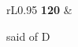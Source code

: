 {\begin{tabular}{rL{0.95\linewidth}}
\textbf{120} &\strut{}\smallmasktok{}\smallmasktok{}\smallmasktok{}\smallmasktok{}\smallmasktok{}\smallmasktok{}\smallmasktok{}\smallmasktok{}\smallmasktok{}\smallmasktok{}\smallmasktok{}\smallmasktok{}\smallmasktok{}\smallmasktok{}\smallmasktok{}\smallmasktok{}\smallmasktok{}\smallmasktok{}\smallmasktok{}\smallmasktok{}\smallmasktok{}\smallmasktok{}\smallmasktok{}\smallmasktok{}\smallmasktok{}\smallmasktok{}\smallmasktok{}\smallmasktok{}\smallmasktok{}\smallmasktok{}\smallmasktok{}\smallmasktok{}\smallmasktok{}\smallmasktok{}\smallmasktok{}\smallmasktok{}\smallmasktok{}\smallmasktok{}\smallmasktok{}\smallmasktok{}\smallmasktok{}\smallmasktok{}\smallmasktok{}\smallmasktok{}\smallmasktok{}\smallmasktok{}\smallmasktok{}\smallmasktok{}\smallmasktok{}\smallmasktok{}\smallmasktok{}\smallmasktok{}\smallmasktok{} said\smallmasktok{}\smallmasktok{}\smallmasktok{}\smallmasktok{}\smallmasktok{}\smallmasktok{}\smallmasktok{}\smallmasktok{} of\smallmasktok{}\smallmasktok{}\smallmasktok{}\smallmasktok{}\smallmasktok{}\smallmasktok{}\smallmasktok{}\smallmasktok{}\smallmasktok{}\smallmasktok{} \smallmasktok{}\smallmasktok{}\smallmasktok{}\smallmasktok{}\smallmasktok{}\smallmasktok{}\smallmasktok{}\smallmasktok{}\smallmasktok{}\smallmasktok{}\smallmasktok{} D\smallmasktok{}\smallmasktok{}\smallmasktok{}\smallmasktok{}\smallmasktok{}\smallmasktok{}\smallmasktok{}\smallmasktok{}\smallmasktok{}\smallmasktok{}\smallmasktok{}\smallmasktok{}\smallmasktok{}\smallmasktok{}\smallmasktok{}\smallmasktok{}\smallmasktok{}\smallmasktok{}\smallmasktok{}\smallmasktok{}\smallmasktok{}\smallmasktok{}\smallmasktok{}\smallmasktok{}\smallmasktok{}\smallmasktok{}\smallmasktok{}\smallmasktok{}\smallmasktok{}\smallmasktok{}\smallmasktok{}\smallmasktok{}\smallmasktok{}\smallmasktok{}\smallmasktok{}\smallmasktok{}\smallmasktok{}\smallmasktok{}\smallmasktok{}\smallmasktok{}\smallmasktok{}\smallmasktok{}\\

\end{tabular}}
